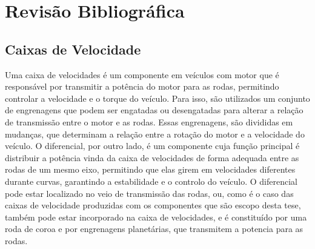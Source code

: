 \chapter{Revisão Bibliográfica} \label{ch:soa}
\setlength{\headheight}{13.6pt}
\section{Caixas de Velocidade} \label{sec:soa_caixas}
Uma caixa de velocidades é um componente em veículos com motor que é responsável por transmitir a potência do motor para as rodas, permitindo controlar a velocidade e o torque do veículo. Para isso, são utilizados um conjunto de engrenagens que podem ser engatadas ou desengatadas para alterar a relação de transmissão entre o motor e as rodas. Essas engrenagens, são divididas em mudanças, que determinam a relação entre a rotação do motor e a velocidade do veículo. O diferencial, por outro lado, é um componente cuja função principal é distribuir a potência vinda da caixa de velocidades de forma adequada entre as rodas de um mesmo eixo, permitindo que elas girem em velocidades diferentes durante curvas, garantindo a estabilidade e o controlo do veículo. O diferencial pode estar localizado no veio de transmissão das rodas, ou, como é o caso das caixas de velocidade produzidas com os componentes que são escopo desta tese, também pode estar incorporado na caixa de velocidades, e é constituído por uma roda de coroa e por engrenagens planetárias, que transmitem a potencia para as rodas.
